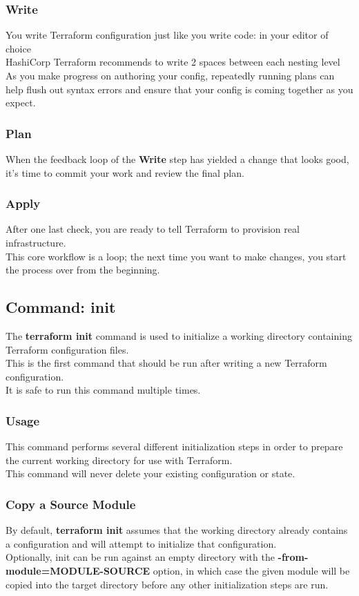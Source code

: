 \documentclass[12pt, letterpaper, twoside]{article}
\begin{document}
\subsubsection{Write}
You write Terraform configuration just like you write code: in your editor of choice\\
HashiCorp Terraform recommends to write 2 spaces between each nesting level\\
As you make progress on authoring your config, repeatedly running plans can help 
flush out syntax errors and ensure that your config is coming together as you expect.

\subsubsection{Plan}
When the feedback loop of the \textbf{Write} step has yielded a change that looks good, 
it's time to commit your work and review the final plan.

\subsubsection{Apply}
After one last check, you are ready to tell Terraform to provision real infrastructure.\\
This core workflow is a loop; the next time you want to make changes, you start the process over from the beginning.

\subsection{Command: init}
The \textbf{terraform init} command is used to initialize a working directory containing 
Terraform configuration files.\\
This is the first command that should be run after writing a new Terraform configuration.\\
It is safe to run this command multiple times.

\subsubsection{Usage}
This command performs several different initialization steps in order to prepare the current 
working directory for use with Terraform.\\
This command will never delete your existing configuration or state.

\subsubsection{Copy a Source Module}
By default, \textbf{terraform init} assumes that the working directory already contains a 
configuration and will attempt to initialize that configuration.\\
Optionally, init can be run against an empty directory with the \textbf{-from-module=MODULE-SOURCE} 
option, in which case the given module will be copied into the target directory 
before any other initialization steps are run.\\
\end{document}

